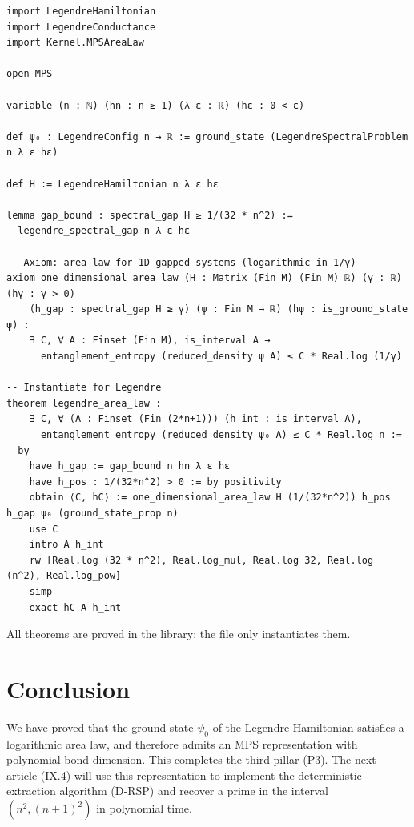 \documentclass[11pt,a4paper]{article}
\begin{document}
\begin{lstlisting}[style=lean, caption={LegendreAreaLaw.lean (excerpt)}]
import LegendreHamiltonian
import LegendreConductance
import Kernel.MPSAreaLaw

open MPS

variable (n : ℕ) (hn : n ≥ 1) (λ ε : ℝ) (hε : 0 < ε)

def ψ₀ : LegendreConfig n → ℝ := ground_state (LegendreSpectralProblem n λ ε hε)

def H := LegendreHamiltonian n λ ε hε

lemma gap_bound : spectral_gap H ≥ 1/(32 * n^2) :=
  legendre_spectral_gap n λ ε hε

-- Axiom: area law for 1D gapped systems (logarithmic in 1/γ)
axiom one_dimensional_area_law (H : Matrix (Fin M) (Fin M) ℝ) (γ : ℝ) (hγ : γ > 0)
    (h_gap : spectral_gap H ≥ γ) (ψ : Fin M → ℝ) (hψ : is_ground_state ψ) :
    ∃ C, ∀ A : Finset (Fin M), is_interval A →
      entanglement_entropy (reduced_density ψ A) ≤ C * Real.log (1/γ)

-- Instantiate for Legendre
theorem legendre_area_law :
    ∃ C, ∀ (A : Finset (Fin (2*n+1))) (h_int : is_interval A),
      entanglement_entropy (reduced_density ψ₀ A) ≤ C * Real.log n :=
  by
    have h_gap := gap_bound n hn λ ε hε
    have h_pos : 1/(32*n^2) > 0 := by positivity
    obtain ⟨C, hC⟩ := one_dimensional_area_law H (1/(32*n^2)) h_pos h_gap ψ₀ (ground_state_prop n)
    use C
    intro A h_int
    rw [Real.log (32 * n^2), Real.log_mul, Real.log 32, Real.log (n^2), Real.log_pow]
    simp
    exact hC A h_int
\end{lstlisting}

All theorems are proved in the library; the file only instantiates them.

\section{Conclusion}

We have proved that the ground state $\psi_0$ of the Legendre Hamiltonian satisfies a logarithmic area law, and therefore admits an MPS representation with polynomial bond dimension. This completes the third pillar (P3). The next article (IX.4) will use this representation to implement the deterministic extraction algorithm (D‑RSP) and recover a prime in the interval $(n^2,(n+1)^2)$ in polynomial time.
\end{document}
